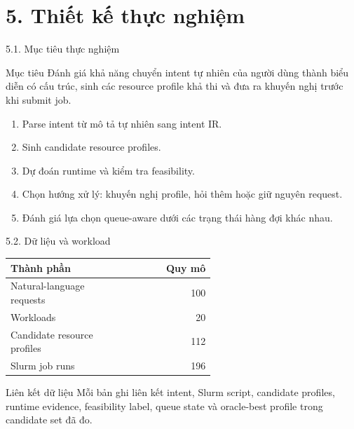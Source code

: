 \section{5. Thiết kế thực nghiệm}

\begin{frame}[t]{5.1. Mục tiêu thực nghiệm}
\small
\begin{block}{Mục tiêu}
Đánh giá khả năng chuyển intent tự nhiên của người dùng thành biểu diễn có cấu trúc, sinh các resource profile khả thi và đưa ra khuyến nghị trước khi submit job.
\end{block}
\begin{enumerate}
  \item Parse intent từ mô tả tự nhiên sang intent IR.
  \item Sinh candidate resource profiles.
  \item Dự đoán runtime và kiểm tra feasibility.
  \item Chọn hướng xử lý: khuyến nghị profile, hỏi thêm hoặc giữ nguyên request.
  \item Đánh giá lựa chọn queue-aware dưới các trạng thái hàng đợi khác nhau.
\end{enumerate}
\end{frame}

\begin{frame}[t]{5.2. Dữ liệu và workload}
\small
\centering
\begin{tabular}{p{0.58\linewidth}r}
\toprule
\textbf{Thành phần} & \textbf{Quy mô} \\
\midrule
Natural-language requests & 100 \\
Workloads & 20 \\
Candidate resource profiles & 112 \\
Slurm job runs & 196 \\
\bottomrule
\end{tabular}
\vspace{0.45cm}
\begin{block}{Liên kết dữ liệu}
Mỗi bản ghi liên kết intent, Slurm script, candidate profiles, runtime evidence, feasibility label, queue state và oracle-best profile trong candidate set đã đo.
\end{block}
\end{frame}

